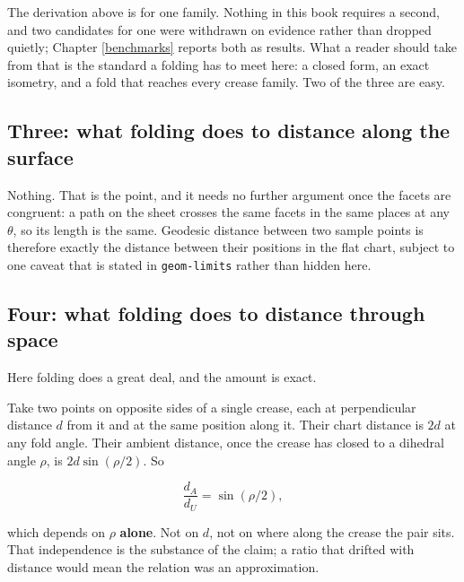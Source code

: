 \documentclass[
  british,
  a4paper,
]{book}
\begin{document}
The derivation above is for one family. Nothing in this book requires a second,
and two candidates for one were withdrawn on evidence rather than dropped
quietly; Chapter \ref{benchmarks} reports both as results. What a reader should
take from that is the standard a folding has to meet here: a closed form, an
exact isometry, and a fold that reaches every crease family. Two of the three are
easy.

\subsection{Three: what folding does to distance along the surface}\label{three-what-folding-does-to-distance-along-the-surface}

Nothing. That is the point, and it needs no further argument once the facets are
congruent: a path on the sheet crosses the same facets in the same places at any
\(\theta\), so its length is the same. Geodesic distance between two sample points
is therefore exactly the distance between their positions in the flat chart,
subject to one caveat that is stated in \texttt{geom-limits} rather than hidden here.

\subsection{Four: what folding does to distance through space}\label{four-what-folding-does-to-distance-through-space}

Here folding does a great deal, and the amount is exact.

Take two points on opposite sides of a single crease, each at perpendicular
distance \(d\) from it and at the same position along it. Their chart distance is
\(2d\) at any fold angle. Their ambient distance, once the crease has closed to a
dihedral angle \(\rho\), is \(2d\sin(\rho/2)\). So

\[\frac{d_A}{d_U} = \sin(\rho/2),\]

which depends on \(\rho\) \textbf{alone}. Not on \(d\), not on where along the crease the
pair sits. That independence is the substance of the claim; a ratio that drifted
with distance would mean the relation was an approximation.
\end{document}
